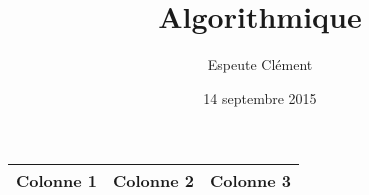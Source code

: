 \documentclass[11pt]{article}
\title{Algorithmique}
\author{{\sc Espeute} Clément}
\date{14 septembre 2015}
\begin{document}
\pagestyle{fancy}
\maketitle
\newpage

\begin{tabularx}{\textwidth}{|X|X|X|}
	\hline
	Colonne 1 & Colonne 2 & Colonne 3 \\ 
	\hline
\end{tabularx}
\end{document}
